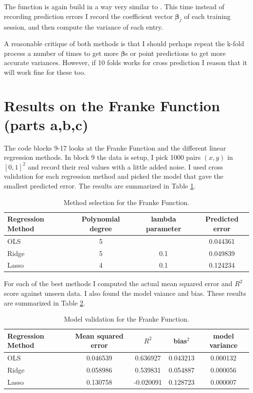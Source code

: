 \documentclass[parskip=half]{scrartcl}
\theoremstyle{definition}
\theoremstyle{remark}
\newcommand{\vect}[1]{{\bm{#1}}}
\newcommand{\funcname}[1]{{\color{blue}{\texttt{#1}}}}
\begin{document}
The function \funcname{beta\_variance} is again build in a way very similar to \funcname{cross\_validation}. 
This time instead of recording prediction errors I record the coefficient vector $\vect{\beta}_j$ of each training session, and then compute the variance of each entry. 

A reasonable critique of both methods is that I should perhaps repeat the k-fold process a number of times to get more $\vect{\beta}$s or point predictions to get more accurate variances.
However, if 10 folds works for cross prediction I reason that it will work fine for these too.

\section{Results on the Franke Function (parts a,b,c)} \label{sec:franke}

The code blocks 9-17 looks at the Franke Function and the different linear regression methods. 
In block 9 the data is setup, I pick 1000 pairs $(x,y)$ in $[0,1]^2$ and record their real values with a little added noise. 
I used cross validation for each regression method and picked the model that gave the smallest predicted error.
The results are summarized in Table \ref{tab:cvff}.

\begin{table} 
\caption{Method selection for the Franke Function.}
\label{tab:cvff}
\begin{center}
\begin{tabular}{l|ccc}
Regression Method & Polynomial degree & lambda parameter & Predicted error \\ 
\hline
\hline 
OLS & 5 &  & 0.044361 \\ 
Ridge & 5 & 0.1 & 0.049839 \\ 
Lasso & 4 & 0.1 & 0.124234
\end{tabular} 
\end{center}
\end{table}

For each of the best methods I computed the actual mean squared error and $R^2$ score against unseen data. 
I also found the model vaiance and bias.
These results are summarized in Table \ref{tab:varff}.

\begin{table} 
\caption{Model validation for the Franke Function.}
\label{tab:varff}
\begin{center}
\begin{tabular}{l|cccc}
Regression Method & Mean squared error & $R^2$ & bias$^2$ & model variance  \\ 
\hline
\hline 
OLS &  0.046539 & 0.636927 & 0.043213 & 0.000132 \\ 
Ridge & 0.058986 & 0.539831 & 0.054887 & 0.000056 \\ 
Lasso & 0.130758 & -0.020091 & 0.128723 & 0.000007
\end{tabular} 
\end{center}
\end{table}
\end{document}
